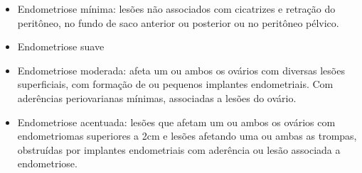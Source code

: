 \documentclass[12pt]{article} %
\begin{document}
\begin{itemize}
\item Endometriose mínima: lesões não associados com cicatrizes e
  retração do peritôneo, no fundo de saco anterior ou posterior ou no
  peritôneo pélvico.
\item Endometriose suave
\item Endometriose moderada: afeta um ou ambos os ovários com diversas
  lesões superficiais, com formação de  ou pequenos
  implantes endometriais. Com aderências periovarianas mínimas,
  associadas a lesões do ovário.
\item Endometriose acentuada: lesões que afetam um ou ambos os ovários
  com endometriomas superiores a 2cm e lesões afetando uma ou ambas as
  trompas, obstruídas por implantes endometriais com aderência ou
  lesão associada a endometriose.
\end{itemize}
\end{document}

